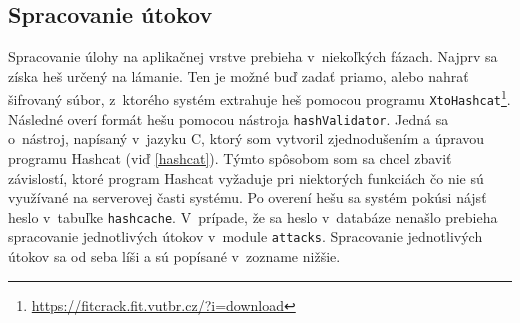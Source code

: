 \documentclass[slovak]{fitthesis}
\begin{document}
\subsection{Spracovanie útokov}
Spracovanie úlohy na aplikačnej vrstve prebieha v~niekoľkých fázach. Najprv sa získa heš určený na lámanie. Ten je možné buď zadať priamo, alebo nahrať šifrovaný súbor, z~ktorého systém extrahuje heš pomocou programu \texttt{XtoHashcat}\footnote{\url{https://fitcrack.fit.vutbr.cz/?i=download}}. Následné overí formát hešu pomocou nástroja \texttt{hashValidator}. Jedná sa o~nástroj, napísaný v~jazyku C, ktorý som vytvoril zjednodušením a úpravou programu Hashcat (viď \ref{hashcat}). Týmto spôsobom som sa chcel zbaviť závislostí, ktoré program Hashcat vyžaduje pri niektorých funkciách čo nie sú využívané na serverovej časti systému. Po overení hešu sa systém pokúsi nájsť heslo v~tabuľke \texttt{hashcache}. V~prípade, že sa heslo v~databáze nenašlo prebieha spracovanie jednotlivých útokov v~module \texttt{attacks}. Spracovanie jednotlivých útokov sa od seba líši a sú popísané v~zozname nižšie.
\end{document}
